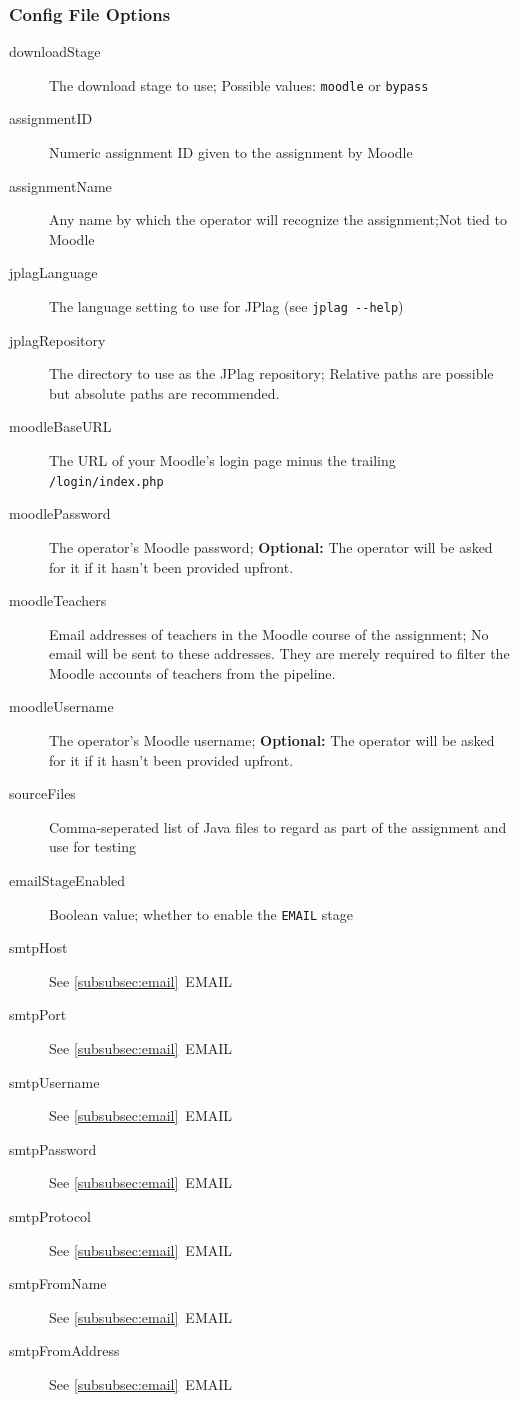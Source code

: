 \documentclass[12pt,a4paper,oneside]{report}
\begin{document}
	\subsubsection{Config File Options}

	\begin{description}
		\item[downloadStage] The download stage to use; Possible values: \lstinline|moodle| or \lstinline|bypass|
		\item[assignmentID] Numeric assignment ID given to the assignment by Moodle
		\item[assignmentName] Any name by which the operator will recognize the assignment;\linebreak{}Not tied to Moodle
		\item[jplagLanguage] The language setting to use for JPlag (see \lstinline|jplag --help|)
		\item[jplagRepository] The directory to use as the JPlag repository; Relative paths are possible but absolute paths are recommended.
		\item[moodleBaseURL] The URL of your Moodle's login page minus the trailing \lstinline|/login/index.php|
		\item[moodlePassword] The operator's Moodle password; \textbf{Optional:} The operator will be asked for it if it hasn't been provided upfront.
		\item[moodleTeachers] Email addresses of teachers in the Moodle course of the assignment; No email will be sent to these addresses. They are merely required to filter the Moodle accounts of teachers from the pipeline.
		\item[moodleUsername] The operator's Moodle username; \textbf{Optional:} The operator will be asked for it if it hasn't been provided upfront.
		\item[sourceFiles] Comma-seperated list of Java files to regard as part of the assignment and use for testing
		\item[emailStageEnabled] Boolean value; whether to enable the \lstinline|EMAIL| stage
		\item[smtpHost] See \ref{subsubsec:email}~EMAIL
		\item[smtpPort] See \ref{subsubsec:email}~EMAIL
		\item[smtpUsername] See \ref{subsubsec:email}~EMAIL
		\item[smtpPassword] See \ref{subsubsec:email}~EMAIL
		\item[smtpProtocol] See \ref{subsubsec:email}~EMAIL
		\item[smtpFromName] See \ref{subsubsec:email}~EMAIL
		\item[smtpFromAddress] See \ref{subsubsec:email}~EMAIL

	\end{description}
\end{document}
